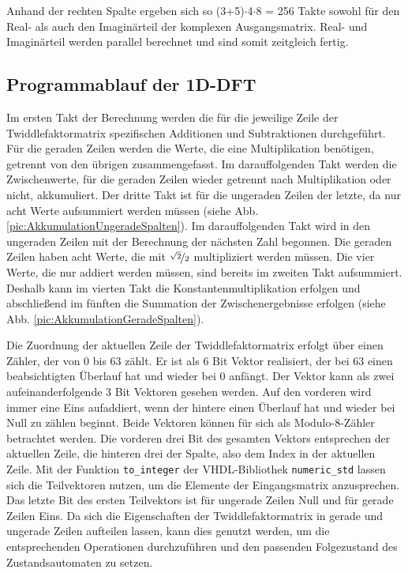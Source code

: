 Anhand der rechten Spalte ergeben sich so (3+5)$\cdot$4$\cdot$8 = 256 Takte sowohl für den Real- als auch den Imaginärteil der komplexen Ausgangsmatrix. Real- und Imaginärteil
werden parallel berechnet und sind somit zeitgleich fertig.


\subsection{Programmablauf der 1D-DFT}\label{sec:Programmablauf1D}
Im ersten Takt der Berechnung werden die für die jeweilige Zeile der Twiddlefaktormatrix spezifischen Additionen und Subtraktionen durchgeführt. 
Für die geraden Zeilen werden die Werte, die eine Multiplikation benötigen, getrennt von den übrigen zusammengefasst.
Im darauffolgenden Takt werden die Zwischenwerte, für die geraden Zeilen wieder getrennt nach Multiplikation oder nicht, akkumuliert.
Der dritte Takt ist für die ungeraden Zeilen der letzte, da nur acht Werte aufsummiert werden müssen (siehe Abb. \ref{pic:AkkumulationUngeradeSpalten}). 
Im darauffolgenden Takt wird in den ungeraden Zeilen mit der Berechnung der nächsten Zahl begonnen.
Die geraden Zeilen haben acht Werte, die mit $\nicefrac{\sqrt{2}}{2}$ multipliziert werden müssen. Die vier Werte, die nur addiert werden müssen, sind bereits im zweiten Takt 
aufsummiert. Deshalb kann im vierten Takt die Konstantenmultiplikation erfolgen und abschließend im fünften die Summation der Zwischenergebnisse erfolgen (siehe Abb. \ref{pic:AkkumulationGeradeSpalten}).

Die Zuordnung der aktuellen Zeile der Twiddlefaktormatrix erfolgt über einen Zähler, der von 0 bis 63 zählt. Er ist als 6 Bit Vektor realisiert, der bei 63 einen beabsichtigten Überlauf hat und wieder bei 0 anfängt.
Der Vektor kann als zwei aufeinanderfolgende 3 Bit Vektoren gesehen werden. Auf den vorderen wird immer eine Eins aufaddiert, wenn der hintere einen Überlauf hat und wieder bei Null zu zählen beginnt. Beide Vektoren können für sich als Modulo-8-Zähler betrachtet werden.
Die vorderen drei Bit des gesamten Vektors entsprechen der aktuellen Zeile, die hinteren drei der Spalte, also dem Index in der aktuellen Zeile.
Mit der Funktion \texttt{to\_integer} der VHDL-Bibliothek \texttt{numeric\_std} lassen sich die Teilvektoren nutzen, um die Elemente der Eingangsmatrix anzusprechen.
Das letzte Bit des ersten Teilvektors ist für ungerade Zeilen Null und für gerade Zeilen Eins.
Da sich die Eigenschaften der Twiddlefaktormatrix in gerade und ungerade Zeilen aufteilen lassen, kann dies genutzt werden, um die entsprechenden Operationen durchzuführen und den passenden Folgezustand des Zustandsautomaten zu setzen.


